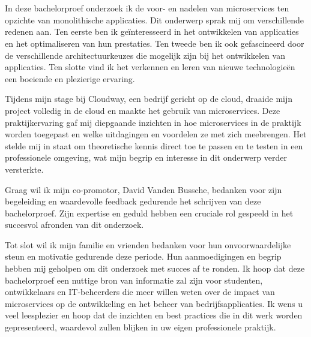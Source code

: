 
\chapter*{}%
\label{ch:voorwoord}

In deze bachelorproef onderzoek ik de voor- en nadelen van microservices ten opzichte van monolithische applicaties. Dit onderwerp sprak mij om verschillende redenen aan. Ten eerste ben ik geïnteresseerd in het ontwikkelen van applicaties en het optimaliseren van hun prestaties. Ten tweede ben ik ook gefascineerd door de verschillende architectuurkeuzes die mogelijk zijn bij het ontwikkelen van applicaties. Ten slotte vind ik het verkennen en leren van nieuwe technologieën een boeiende en plezierige ervaring.


Tijdens mijn stage bij Cloudway, een bedrijf gericht op de cloud, draaide mijn project volledig in de cloud en maakte het gebruik van microservices. Deze praktijkervaring gaf mij diepgaande inzichten in hoe microservices in de praktijk worden toegepast en welke uitdagingen en voordelen ze met zich meebrengen. Het stelde mij in staat om theoretische kennis direct toe te passen en te testen in een professionele omgeving, wat mijn begrip en interesse in dit onderwerp verder versterkte.


Graag wil ik mijn co-promotor, David Vanden Bussche, bedanken voor zijn begeleiding en waardevolle feedback gedurende het schrijven van deze bachelorproef. Zijn expertise en geduld hebben een cruciale rol gespeeld in het succesvol afronden van dit onderzoek. 


Tot slot wil ik mijn familie en vrienden bedanken voor hun onvoorwaardelijke steun en motivatie gedurende deze periode. Hun aanmoedigingen en begrip hebben mij geholpen om dit onderzoek met succes af te ronden. Ik hoop dat deze bachelorproef een nuttige bron van informatie zal zijn voor studenten, ontwikkelaars en IT-beheerders die meer willen weten over de impact van microservices op de ontwikkeling en het beheer van bedrijfsapplicaties. Ik wens u veel leesplezier en hoop dat de inzichten en best practices die in dit werk worden gepresenteerd, waardevol zullen blijken in uw eigen professionele praktijk.
